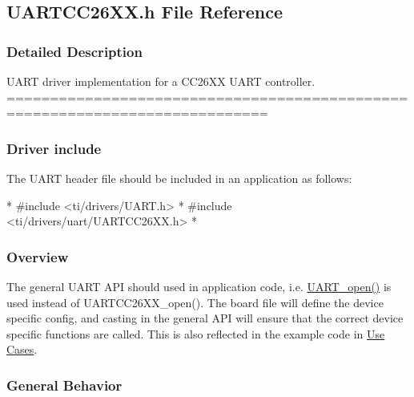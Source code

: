 \subsection{U\-A\-R\-T\-C\-C26\-X\-X.\-h File Reference}
\label{_u_a_r_t_c_c26_x_x_8h}


\subsubsection{Detailed Description}
U\-A\-R\-T driver implementation for a C\-C26\-X\-X U\-A\-R\-T controller. ============================================================================

\subsubsection*{Driver include}

The U\-A\-R\-T header file should be included in an application as follows\-: 
\begin{DoxyCode}
*  #include <ti/drivers/UART.h>
*  #include <ti/drivers/uart/UARTCC26XX.h>
*  
\end{DoxyCode}


\subsubsection*{Overview}

The general U\-A\-R\-T A\-P\-I should used in application code, i.\-e. \hyperlink{_u_a_r_t_8h_a0442ea1ec23901168da31726bb3254c1}{U\-A\-R\-T\-\_\-open()} is used instead of U\-A\-R\-T\-C\-C26\-X\-X\-\_\-open(). The board file will define the device specific config, and casting in the general A\-P\-I will ensure that the correct device specific functions are called. This is also reflected in the example code in \hyperlink{_u_a_r_t_c_c26_x_x_8h_USE_CASES}{Use Cases}.

\subsubsection*{General Behavior}

